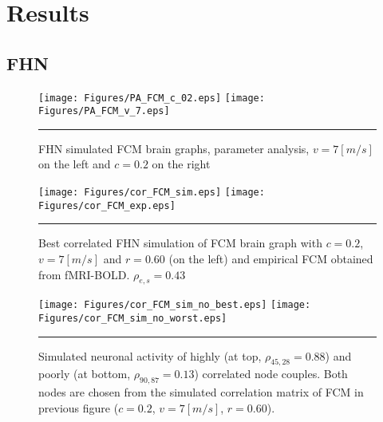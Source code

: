 
\chapter{Results} %

\label{Chapter3} %



\section{FHN}



\begin{figure}[htbp]
 
  \centering
    \texttt{[image: Figures/PA\_FCM\_c\_02.eps]} 
	\texttt{[image: Figures/PA\_FCM\_v\_7.eps]} 

	
    \rule{35em}{0.5pt}
  \caption[Parameter Analysis, FCM]{FHN simulated FCM brain graphs, parameter analysis, $v=7[m/s]$ on the left and $c=0.2$ on the right }
  \label{fig:Parameter Analysis, FCM}
 	
\end{figure}  



\begin{figure}[htbp]
 
  \centering
	 \texttt{[image: Figures/cor\_FCM\_sim.eps]} 
   	 \texttt{[image: Figures/cor\_FCM\_exp.eps]} 

    \rule{35em}{0.5pt}
  \caption[Best correlated FHN simulation, FCM]{Best correlated FHN simulation of FCM brain graph with $c=0.2$, $v=7 [m/s]$ and $r=0.60$ (on the left) and empirical FCM obtained from fMRI-BOLD. $\rho_{e,s} = 0.43$} 
    \label{fig:Best correlated FHN simulation, FCM}
 	
\end{figure}  



\begin{figure}[htbp]
 
  \centering
	 \texttt{[image: Figures/cor\_FCM\_sim\_no\_best.eps]} 
   	 \texttt{[image: Figures/cor\_FCM\_sim\_no\_worst.eps]} 

    \rule{35em}{0.5pt}
  \caption[Neural Activity Node Dynamics, FCM]{Simulated neuronal activity of highly (at top, $\rho_{45,28}=0.88$) and poorly (at bottom, $\rho_{90,87}=0.13$) correlated node couples. Both nodes are chosen from the simulated correlation matrix of FCM in previous figure ($c=0.2$, $v=7 [m/s]$, $r=0.60$).} 
    \label{fig:Neural Activity Node Dynamics, FCM}
 	
\end{figure} 


